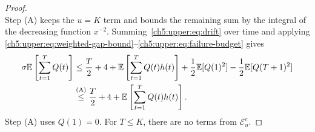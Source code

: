 \begin{proof}
\begin{equation}
 \label{ch5:upper:eq:failure-budget}
\end{equation}
Step (A) keeps the $u=K$ term and bounds the remaining sum by the
integral of the decreasing function $x^{-2}$.
Summing~\eqref{ch5:upper:eq:drift} over time and applying
\eqref{ch5:upper:eq:weighted-gap-bound}--\eqref{ch5:upper:eq:failure-budget} gives
\begin{align}
\sigma\mathbb{E}\left[\sum_{t=1}^{T}Q(t)\right]
 &\le\frac T2+4+\mathbb{E}\left[\sum_{t=1}^{T}Q(t)h(t)\right]
+\frac12\mathbb{E}[Q(1)^2]-\frac12\mathbb{E}[Q(T+1)^2]\notag\\
 &\overset{\mathrm{(A)}}{\le}\frac T2+4+\mathbb{E}\left[\sum_{t=1}^{T}Q(t)h(t)\right].
 \label{ch5:upper:eq:summed-drift}
\end{align}
Step (A) uses $Q(1)=0$. For $T\le K$, there are no terms from $\mathcal E_u^c$.


\end{proof}
